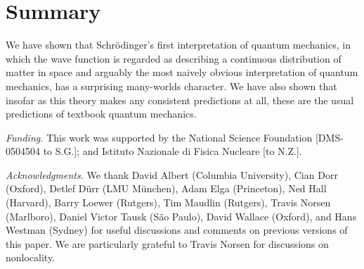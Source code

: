 \documentclass[12pt]{article}
\newcommand{\z}[1]{{#1}}
\begin{document}
\section{Summary}

We have shown that Schr\"odinger's first interpretation of quantum mechanics, in which the wave function is regarded as describing a continuous distribution of matter in space and arguably the most naively obvious interpretation of quantum mechanics, has a surprising many-worlds character. We have also shown that insofar as this theory makes any consistent predictions at all, these are the usual predictions of textbook quantum mechanics.

\bigskip

\noindent\textit{Funding.} 
This work was supported by the National Science Foundation [DMS-0504504 to S.G.]; and Istituto Nazionale di Fisica Nucleare [to N.Z.].

\bigskip

\noindent\textit{Acknowledgments.} 
We thank David Albert (Columbia University), Cian Dorr (Oxford), Detlef D\"urr (LMU M\"unchen), Adam Elga (Princeton), Ned Hall (Harvard), Barry Loewer (Rutgers), Tim Maudlin (Rutgers), Travis Norsen (Marlboro), Daniel Victor Tausk (S\~ao Paulo), \z{David Wallace (Oxford),} and Hans Westman (Sydney) for useful discussions and comments on previous versions of this paper. We are particularly grateful to Travis Norsen for discussions on nonlocality. %
\end{document}
